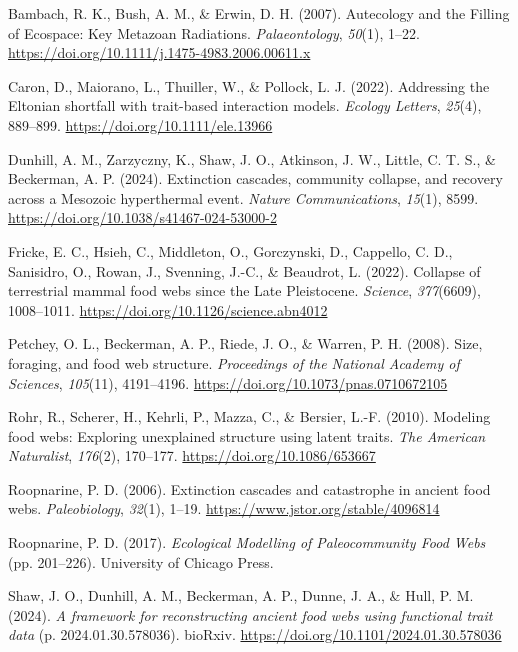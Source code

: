 \documentclass[
]{article}
\newlength{\cslhangindent}
\newenvironment{CSLReferences}[2] %
 {\begin{list}{}{%
  \setlength{\itemindent}{0pt}
  \setlength{\leftmargin}{0pt}
  \setlength{\parsep}{0pt}
  \ifodd #1
   \setlength{\leftmargin}{\cslhangindent}
   \setlength{\itemindent}{-1\cslhangindent}
  \fi
  \setlength{\itemsep}{#2\baselineskip}}}
 {\end{list}}
\begin{document}
\label{refs}
\begin{CSLReferences}{1}{0}
Bambach, R. K., Bush, A. M., \& Erwin, D. H. (2007). Autecology and the
Filling of Ecospace: Key Metazoan Radiations. \emph{Palaeontology},
\emph{50}(1), 1--22.
\url{https://doi.org/10.1111/j.1475-4983.2006.00611.x}

Caron, D., Maiorano, L., Thuiller, W., \& Pollock, L. J. (2022).
Addressing the Eltonian shortfall with trait-based interaction models.
\emph{Ecology Letters}, \emph{25}(4), 889--899.
\url{https://doi.org/10.1111/ele.13966}

Dunhill, A. M., Zarzyczny, K., Shaw, J. O., Atkinson, J. W., Little, C.
T. S., \& Beckerman, A. P. (2024). Extinction cascades, community
collapse, and recovery across a Mesozoic hyperthermal event.
\emph{Nature Communications}, \emph{15}(1), 8599.
\url{https://doi.org/10.1038/s41467-024-53000-2}

Fricke, E. C., Hsieh, C., Middleton, O., Gorczynski, D., Cappello, C.
D., Sanisidro, O., Rowan, J., Svenning, J.-C., \& Beaudrot, L. (2022).
Collapse of terrestrial mammal food webs since the Late Pleistocene.
\emph{Science}, \emph{377}(6609), 1008--1011.
\url{https://doi.org/10.1126/science.abn4012}

Petchey, O. L., Beckerman, A. P., Riede, J. O., \& Warren, P. H. (2008).
Size, foraging, and food web structure. \emph{Proceedings of the
National Academy of Sciences}, \emph{105}(11), 4191--4196.
\url{https://doi.org/10.1073/pnas.0710672105}

Rohr, R., Scherer, H., Kehrli, P., Mazza, C., \& Bersier, L.-F. (2010).
Modeling food webs: Exploring unexplained structure using latent traits.
\emph{The American Naturalist}, \emph{176}(2), 170--177.
\url{https://doi.org/10.1086/653667}

Roopnarine, P. D. (2006). Extinction cascades and catastrophe in ancient
food webs. \emph{Paleobiology}, \emph{32}(1), 1--19.
\url{https://www.jstor.org/stable/4096814}

Roopnarine, P. D. (2017). \emph{Ecological Modelling of Paleocommunity
Food Webs} (pp. 201--226). University of Chicago Press.

Shaw, J. O., Dunhill, A. M., Beckerman, A. P., Dunne, J. A., \& Hull, P.
M. (2024). \emph{A framework for reconstructing ancient food webs using
functional trait data} (p. 2024.01.30.578036). bioRxiv.
\url{https://doi.org/10.1101/2024.01.30.578036}


\end{CSLReferences}
\end{document}
